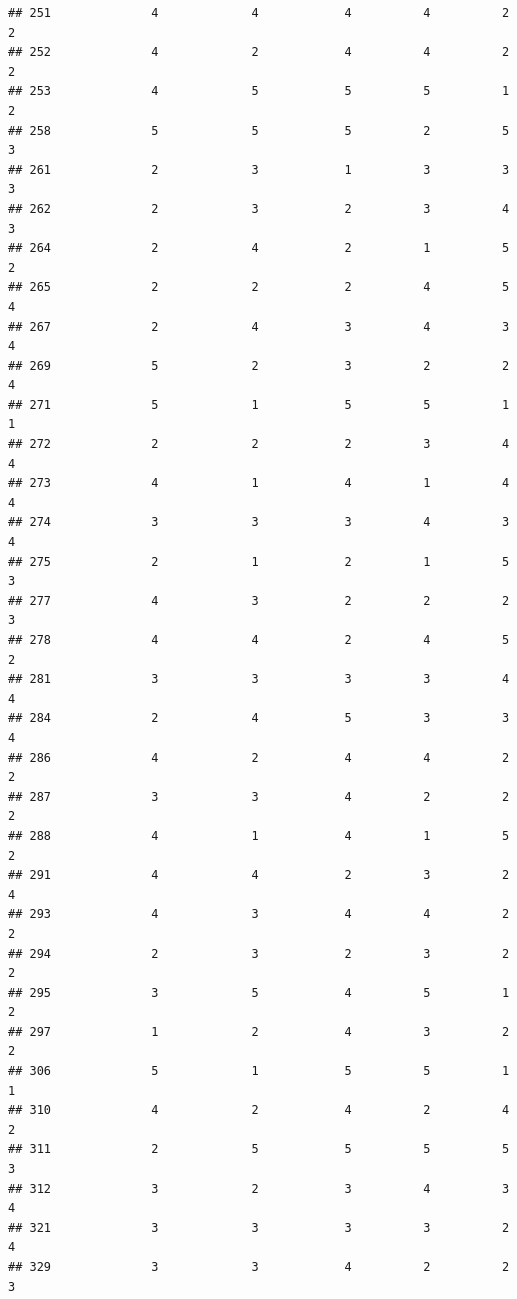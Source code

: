 \documentclass[
]{article}
\begin{document}
\begin{verbatim}
## 251              4             4            4          4          2        2
## 252              4             2            4          4          2        2
## 253              4             5            5          5          1        2
## 258              5             5            5          2          5        3
## 261              2             3            1          3          3        3
## 262              2             3            2          3          4        3
## 264              2             4            2          1          5        2
## 265              2             2            2          4          5        4
## 267              2             4            3          4          3        4
## 269              5             2            3          2          2        4
## 271              5             1            5          5          1        1
## 272              2             2            2          3          4        4
## 273              4             1            4          1          4        4
## 274              3             3            3          4          3        4
## 275              2             1            2          1          5        3
## 277              4             3            2          2          2        3
## 278              4             4            2          4          5        2
## 281              3             3            3          3          4        4
## 284              2             4            5          3          3        4
## 286              4             2            4          4          2        2
## 287              3             3            4          2          2        2
## 288              4             1            4          1          5        2
## 291              4             4            2          3          2        4
## 293              4             3            4          4          2        2
## 294              2             3            2          3          2        2
## 295              3             5            4          5          1        2
## 297              1             2            4          3          2        2
## 306              5             1            5          5          1        1
## 310              4             2            4          2          4        2
## 311              2             5            5          5          5        3
## 312              3             2            3          4          3        4
## 321              3             3            3          3          2        4
## 329              3             3            4          2          2        3

\end{verbatim}
\end{document}
